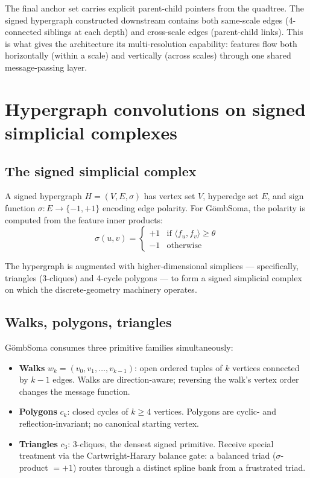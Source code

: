 \documentclass[11pt,a4paper]{article}
\newcommand{\sig}{\ensuremath{\sigma}}
\newcommand{\GS}{G\"ombSoma}
\begin{document}
The final anchor set carries explicit parent-child pointers from
the quadtree. The signed hypergraph constructed downstream
contains both same-scale edges (4-connected siblings at each
depth) and cross-scale edges (parent-child links). This is what
gives the architecture its multi-resolution capability: features
flow both horizontally (within a scale) and vertically (across
scales) through one shared message-passing layer.

\section{Hypergraph convolutions on signed simplicial complexes}

\subsection{The signed simplicial complex}

A signed hypergraph $H = (V, E, \sig)$ has vertex set $V$,
hyperedge set $E$, and sign function $\sig: E \to \{-1, +1\}$
encoding edge polarity. For \GS, the polarity is computed from
the feature inner products:
\[
\sig(u, v) = \begin{cases} +1 & \text{if } \langle f_u, f_v \rangle \geq \theta \\ -1 & \text{otherwise} \end{cases}
\]

The hypergraph is augmented with higher-dimensional simplices —
specifically, triangles (3-cliques) and 4-cycle polygons — to
form a signed simplicial complex on which the discrete-geometry
machinery operates.

\subsection{Walks, polygons, triangles}

\GS{} consumes three primitive families simultaneously:

\begin{itemize}
\item \textbf{Walks} $w_k = (v_0, v_1, \ldots, v_{k-1})$: open
  ordered tuples of $k$ vertices connected by $k-1$ edges. Walks
  are direction-aware; reversing the walk's vertex order changes
  the message function.
\item \textbf{Polygons} $c_k$: closed cycles of $k \geq 4$
  vertices. Polygons are cyclic- and reflection-invariant; no
  canonical starting vertex.
\item \textbf{Triangles} $c_3$: 3-cliques, the densest signed
  primitive. Receive special treatment via the Cartwright-Harary
  balance gate: a balanced triad (\sig-product $= +1$) routes
  through a distinct spline bank from a frustrated triad.
\end{itemize}
\end{document}
